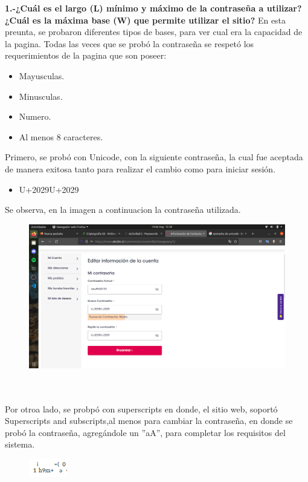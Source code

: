 \documentclass{article}
\begin{document}
\textbf{1.-¿Cuál es el largo (L) mínimo y máximo de la contraseña a utilizar? ¿Cuál es la máxima base (W) que permite utilizar el sitio? }
En esta preunta, se probaron diferentes tipos de bases, para ver cual era la capacidad de la pagina. Todas las veces que se probó la contraseña
se respetó los requerimientos de la pagina que son poseer: 

\begin{itemize}
    \item Mayusculas.
    \item Minusculas.
    \item Numero.
    \item Al menos 8 caracteres. 
\end{itemize}
Primero, se probó con Unicode, con la siguiente contraseña, la cual fue aceptada de manera exitosa tanto para realizar el cambio como para 
iniciar sesión.
\begin{itemize}
    \item U+2029U+2029
\end{itemize}
Se observa, en la imagen a continuacion la contraseña utilizada.
\begin{figure}[h]
    \centering
    \includegraphics[width=15cm]{unicodecl.png}
\end{figure}
\\\\
Por otroa lado, se probpó con superscripts en donde, el sitio web, soportó Superscripts and subscripts,al menos para cambiar la contraseña, en donde se probó la contraseña, agregándole un ''aA'', para completar los requisitos del sistema. 
\begin{figure}[h]
    \centering
    \includegraphics{superscript.PNG}
\end{figure}
\end{document}
